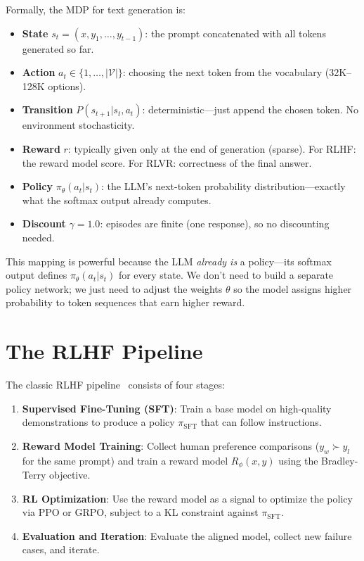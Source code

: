Formally, the MDP for text generation is:

\begin{itemize}
  \item \textbf{State} $s_t = (x, y_1, \ldots, y_{t-1})$: the prompt concatenated with all tokens generated so far.
  \item \textbf{Action} $a_t \in \{1, \ldots, |\mathcal{V}|\}$: choosing the next token from the vocabulary (32K--128K options).
  \item \textbf{Transition} $P(s_{t+1}|s_t, a_t)$: deterministic---just append the chosen token. No environment stochasticity.
  \item \textbf{Reward} $r$: typically given only at the end of generation (sparse). For RLHF: the reward model score. For RLVR: correctness of the final answer.
  \item \textbf{Policy} $\pi_\theta(a_t|s_t)$: the LLM's next-token probability distribution---exactly what the softmax output already computes.
  \item \textbf{Discount} $\gamma = 1.0$: episodes are finite (one response), so no discounting needed.
\end{itemize}

This mapping is powerful because the LLM \emph{already is} a policy---its softmax output defines $\pi_\theta(a_t|s_t)$ for every state. We don't need to build a separate policy network; we just need to adjust the weights $\theta$ so the model assigns higher probability to token sequences that earn higher reward.

\section{The RLHF Pipeline}
\label{the-rlhf-pipeline}

The classic RLHF pipeline~\cite{ouyang2022training} consists of four stages:

\begin{enumerate}
  \item \textbf{Supervised Fine-Tuning (SFT)}: Train a base model on high-quality demonstrations to produce a policy $\pi_{\text{SFT}}$ that can follow instructions.
  \item \textbf{Reward Model Training}: Collect human preference comparisons ($y_w \succ y_l$ for the same prompt) and train a reward model $R_\phi(x, y)$ using the Bradley-Terry objective.
  \item \textbf{RL Optimization}: Use the reward model as a signal to optimize the policy via PPO or GRPO, subject to a KL constraint against $\pi_{\text{SFT}}$.
  \item \textbf{Evaluation and Iteration}: Evaluate the aligned model, collect new failure cases, and iterate.
\end{enumerate}

